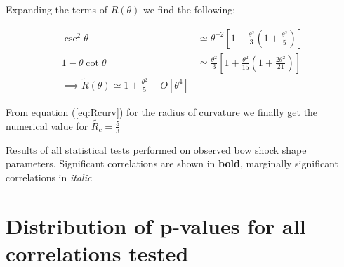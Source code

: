 Expanding the terms of $R(\theta)$ we find the following:

\begin{align}
  \csc^2\theta &\simeq \theta^{-2}\left[1+\frac{\theta^2}{3}\left(1+\frac{\theta^2}{5}\right)\right] \\
  1-\theta\cot\theta &\simeq \frac{\theta^2}{3}\left[1 + \frac{\theta^2}{15}\left(1+\frac{2\theta^2}{21}\right)\right] \\
  \implies \tilde{R}(\theta) \simeq 1 + \frac{\theta^2}{5} + O\left[\theta^4\right]
\end{align}

From equation (\ref{eq:Rcurv}) for the radius of curvature we finally get the numerical value for $\tilde{R_c} = \frac{5}{3}$
\clearpage

\addtocounter{section}{1}
\begin{landscape}
\begin{table}
  \setlength\tabcolsep{3pt}
  \caption{Results of all statistical tests performed on observed bow shock shape parameters. Significant correlations are shown in \textbf{bold}, marginally significant correlations in \textit{italic}}
  \label{tab:big-p}
  
\end{table}
\end{landscape}
\addtocounter{section}{-1}

\section{Distribution of p-values for all correlations tested}
\label{sec:distr-p-values}

